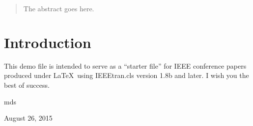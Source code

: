 \documentclass[conference]{IEEEtran}
\begin{document}
\maketitle

\begin{abstract}
The abstract goes here.
\end{abstract}





%
\IEEEpeerreviewmaketitle



\section{Introduction}
This demo file is intended to serve as a ``starter file''
for IEEE conference papers produced under \LaTeX\ using
IEEEtran.cls version 1.8b and later.
I wish you the best of success.

\hfill mds
 
\hfill August 26, 2015
\end{document}
